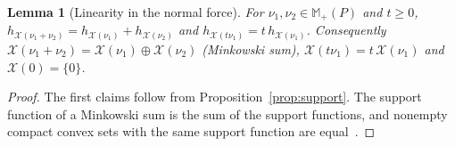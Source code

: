 \documentclass[11pt,a4paper]{article}
\theoremstyle{plain}
\newtheorem{lemma}[theorem]{Lemma}
\newtheorem{remark}[theorem]{Remark}
\newcommand{\X}{\mathcal X}
\begin{document}

\begin{lemma}[Linearity in the normal force]
\label{lem:linearity}
    For $\nu_1,\nu_2\in\mathbb M_+(P)$ and $t\ge0$, $h_{\X(\nu_1+\nu_2)}=h_{\X(\nu_1)}+h_{\X(\nu_2)}$ and $h_{\X(t\nu_1)}=t\,h_{\X(\nu_1)}$. Consequently
    $\X(\nu_1+\nu_2)=\X(\nu_1)\oplus\X(\nu_2)$ (Minkowski sum), $\X(t\nu_1)=t\,\X(\nu_1)$ and $\X(0)=\{0\}$.
\end{lemma}
\begin{proof}
    The first claims follow from Proposition~\ref{prop:support}. The support function of a Minkowski sum is the sum of the support functions, and nonempty compact convex sets
    with the same support function are equal~\cite[Section~13]{rockafellar1970convex}.
\end{proof}
\end{document}
